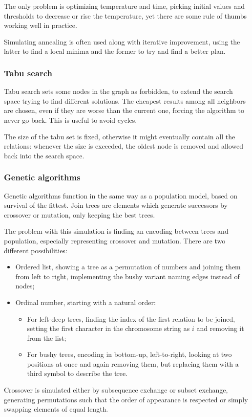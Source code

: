 The only problem is optimizing temperature and time, picking initial values and thresholds to decrease or rise the temperature, yet there are some rule of thumbs working well in practice.

Simulating annealing is often used along with iterative improvement, using the latter to find a local minima and the former to try and find a better plan.

\subsubsection{Tabu search}
Tabu search sets some nodes in the graph as forbidden, to extend the search space trying to find different solutions. The cheapest results among all neighbors are chosen, even if they are worse than the current one, forcing the algorithm to never go back. This is useful to avoid cycles.  

The size of the tabu set is fixed, otherwise it might eventually contain all the relations: whenever the size is exceeded, the oldest node is removed and allowed back into the search space. 

\subsubsection{Genetic algorithms}
Genetic algorithms function in the same way as a population model, based on survival of the fittest. Join trees are elements which generate successors by crossover or mutation, only keeping the best trees.

The problem with this simulation is finding an encoding between trees and population, especially representing crossover and mutation. There are two different possibilities: 
\begin{itemize}
	\item Ordered list, showing a tree as a permutation of numbers and joining them from left to right, implementing the bushy variant naming edges instead of nodes;
	\item Ordinal number, starting with a natural order:
	\begin{itemize}
		\item For left-deep trees, finding the index of the first relation to be joined, setting the first character in the chromosome string as $i$ and removing it from the list;
		\item For bushy trees, encoding in bottom-up, left-to-right, looking at two positions at once and again removing them, but replacing them with a third symbol to describe the tree.
	\end{itemize}
\end{itemize}
Crossover is simulated either by subsequence exchange or subset exchange, generating permutations such that the order of appearance is respected or simply swapping elements of equal length.

